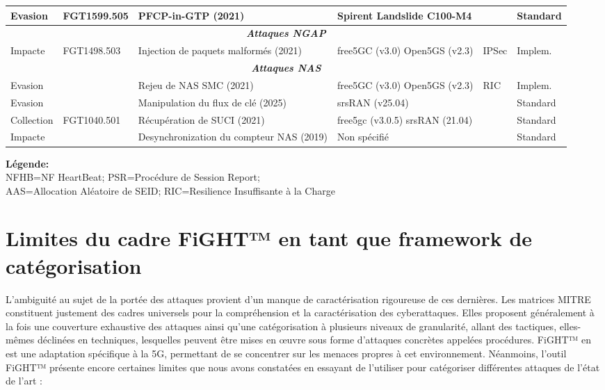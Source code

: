 \documentclass[a4paper,11pt,twoside]{StyleThese}
\begin{document}
\begin{table}[htbp]
{\begin{tabular}{|p{1.6cm}|p{2cm}|p{3cm}|p{2.0cm}|p{2.0cm}|p{1.4cm}|}
    Evasion & FGT1599.505 & PFCP-in-GTP \cite{pfcp_in_gtp} (2021) & Spirent Landslide C100-M4 & \cellcolor{gray} & Standard \\ \hline
    \multicolumn{6}{|c|}{\textit{\textbf{Attaques NGAP}}} \\ \hline
    Impacte & FGT1498.503 & Injection de paquets malformés \cite{5greplay} (2021) & free5GC (v3.0) Open5GS (v2.3) & IPSec & Implem. \\ \hline
    \multicolumn{6}{|c|}{\textit{\textbf{Attaques NAS}}} \\ \hline
    Evasion & \cellcolor{gray} & Rejeu de NAS SMC \cite{5greplay} (2021) & free5GC (v3.0) Open5GS (v2.3) & RIC & Implem. \\ \hline
    Evasion & \cellcolor{gray} & Manipulation du flux de clé \cite{Fan2025} (2025) & srsRAN (v25.04) & \cellcolor{gray} & Standard \\ \hline
    Collection & FGT1040.501 & Récupération de SUCI \cite{Chlosta2021} (2021) & free5gc (v3.0.5) srsRAN (21.04) & \cellcolor{gray} & Standard \\ \hline
    Impacte & \cellcolor{gray} & Desynchronization du compteur NAS \cite{5Greasoner} (2019) & Non spécifié & \cellcolor{gray} & Standard \\ \hline
    \end{tabular}
}
\vspace{0.8em}
\par\noindent
\footnotesize
\textbf{Légende:}\\
NFHB=NF HeartBeat; 
PSR=Procédure de Session Report; \\
AAS=Allocation Aléatoire de SEID; 
RIC=Resilience Insuffisante à la Charge 
\end{table}

\section{Limites du cadre FiGHT™ en tant que framework de catégorisation}
L'ambiguité au sujet de la portée des attaques provient d'un manque de caractérisation rigoureuse de ces dernières. Les matrices MITRE constituent justement des cadres universels pour la compréhension et la caractérisation des cyberattaques. Elles proposent généralement à la fois une couverture exhaustive des attaques ainsi qu’une catégorisation à plusieurs niveaux de granularité, allant des tactiques, elles-mêmes déclinées en techniques, lesquelles peuvent être mises en œuvre sous forme d’attaques concrètes appelées procédures. FiGHT™\cite{fight} en est une adaptation spécifique à la 5G, permettant de se concentrer sur les menaces propres à cet environnement. Néanmoins, l’outil FiGHT™ présente encore certaines limites que nous avons constatées en essayant de l'utiliser pour catégoriser différentes attaques de l'état de l'art :
\end{document}
